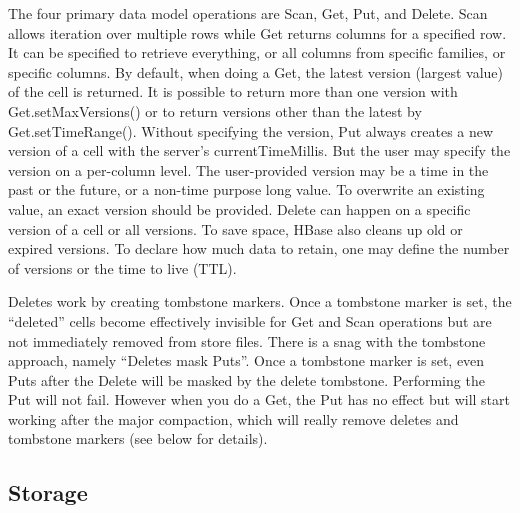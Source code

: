 \documentclass[11pt]{book}
\begin{document}
The four primary data model operations are Scan, Get, Put, and Delete. Scan allows iteration over multiple rows while Get returns columns for a specified row. It can be specified to retrieve everything, or all columns from specific families, or specific columns.
By default, when doing a Get, the latest version (largest value) of the cell is returned. It is possible to return more than one version with Get.setMaxVersions() or to return versions other than the latest by Get.setTimeRange(). Without specifying the version, Put always creates a new version of a cell with the server's currentTimeMillis. But the user may specify the version on a per-column level. The user-provided version may be a time in the past or the future, or a non-time purpose long value. To overwrite an existing value, an exact version should be provided. Delete can happen on a specific version of a cell or all versions. To save space, HBase also cleans up old or expired versions. To declare how much data to retain, one may define the number of versions or the time to live (TTL).

Deletes work by creating tombstone markers. Once a tombstone marker is set, the ``deleted'' cells become effectively invisible for Get and Scan operations but are not immediately removed from store files. There is a snag with the tombstone approach, namely ``Deletes mask Puts''. Once a tombstone marker is set, even Puts after the Delete will be masked by the delete tombstone. Performing the Put will not fail. However when you do a Get, the Put has no effect but will start working  after the major compaction, which will really remove deletes and tombstone markers (see below for details).

\subsection{Storage}
\end{document}
